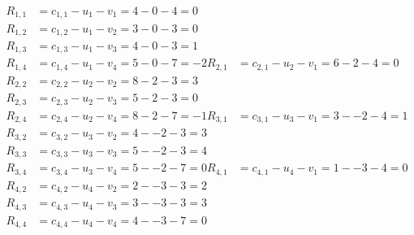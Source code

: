 \[
\begin{aligned}
R_{1,1} &= c_{1,1} - u_{1} - v_{1} = 4 - 0 - 4 = 0 \\
R_{1,2} &= c_{1,2} - u_{1} - v_{2} = 3 - 0 - 3 = 0 \\
R_{1,3} &= c_{1,3} - u_{1} - v_{3} = 4 - 0 - 3 = 1 \\
R_{1,4} &= c_{1,4} - u_{1} - v_{4} = 5 - 0 - 7 = -2 
R_{2,1} &= c_{2,1} - u_{2} - v_{1} = 6 - 2 - 4 = 0 \\
R_{2,2} &= c_{2,2} - u_{2} - v_{2} = 8 - 2 - 3 = 3 \\
R_{2,3} &= c_{2,3} - u_{2} - v_{3} = 5 - 2 - 3 = 0 \\
R_{2,4} &= c_{2,4} - u_{2} - v_{4} = 8 - 2 - 7 = -1 
R_{3,1} &= c_{3,1} - u_{3} - v_{1} = 3 - -2 - 4 = 1 \\
R_{3,2} &= c_{3,2} - u_{3} - v_{2} = 4 - -2 - 3 = 3 \\
R_{3,3} &= c_{3,3} - u_{3} - v_{3} = 5 - -2 - 3 = 4 \\
R_{3,4} &= c_{3,4} - u_{3} - v_{4} = 5 - -2 - 7 = 0 
R_{4,1} &= c_{4,1} - u_{4} - v_{1} = 1 - -3 - 4 = 0 \\
R_{4,2} &= c_{4,2} - u_{4} - v_{2} = 2 - -3 - 3 = 2 \\
R_{4,3} &= c_{4,3} - u_{4} - v_{3} = 3 - -3 - 3 = 3 \\
R_{4,4} &= c_{4,4} - u_{4} - v_{4} = 4 - -3 - 7 = 0 
\end{aligned}
\]

